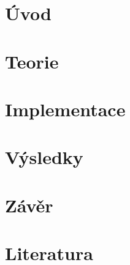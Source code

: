 \documentclass[a4paper,11pt]{article}
\begin{document}


\section{Úvod}


\section{Teorie}


\section{Implementace}

\section{Výsledky}

\section{Závěr}

\section{Literatura}
\end{document}
